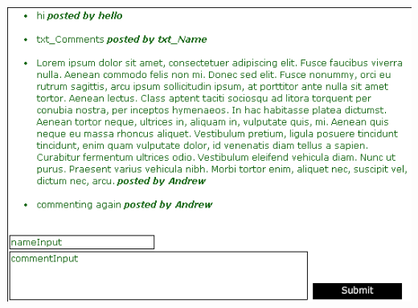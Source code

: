 \documentclass[12pt]{report}
\begin{document}
\begin{center}
\includegraphics[scale=0.70]{flash-tutorial-images/usage-comments-running.png}
\end{center}
\end{document}
